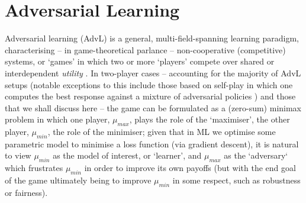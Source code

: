\section{Adversarial Learning}\label{sec:adv-learning}
Adversarial learning (AdvL) is a general, multi-field-spanning learning paradigm, characterising --
in game-theoretical parlance -- non-cooperative (competitive) systems, or `games' in which
two or more `players' compete over shared or interdependent
\emph{utility} \citep{fudenberg1991game}.
%
%
In two-player cases -- accounting for the majority of AdvL setups (notable exceptions to this
include those based on self-play in which one computes the best response against a mixture of
adversarial policies \citep{silver2017mastering, vinyals2019grandmaster}) and those that we shall
discuss here -- the game can be formulated as a (zero-sum) minimax problem in which one player,
\(\mu_{max}\), plays the role of the `maximiser', the other player, \(\mu_{min}\), the role of the
minimiser; given that in ML we optimise some parametric model to minimise a loss function (via
gradient descent), it is natural to view \(\mu_{min}\) as the model of interest, or `learner', and
\(\mu_{max}\) as the `adversary` which frustrates \(\mu_{min}\) in order to improve its own payoffs
(but with the end goal of the game ultimately being to improve \(\mu_{min}\) in some respect, such
as robustness or fairness).
%

